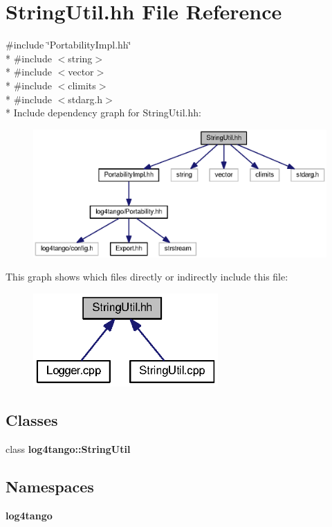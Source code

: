 \section{String\-Util.\-hh File Reference}
\label{StringUtil_8hh}
{\ttfamily \#include \char`\"{}Portability\-Impl.\-hh\char`\"{}}\\*
{\ttfamily \#include $<$string$>$}\\*
{\ttfamily \#include $<$vector$>$}\\*
{\ttfamily \#include $<$climits$>$}\\*
{\ttfamily \#include $<$stdarg.\-h$>$}\\*
Include dependency graph for String\-Util.\-hh\-:
\nopagebreak
\begin{figure}[H]
\begin{center}
\leavevmode
\includegraphics[width=350pt]{d3/d93/StringUtil_8hh__incl}
\end{center}
\end{figure}
This graph shows which files directly or indirectly include this file\-:
\nopagebreak
\begin{figure}[H]
\begin{center}
\leavevmode
\includegraphics[width=200pt]{d1/d88/StringUtil_8hh__dep__incl}
\end{center}
\end{figure}
\subsection*{Classes}
\begin{DoxyCompactItemize}
\item 
class {\bf log4tango\-::\-String\-Util}
\end{DoxyCompactItemize}
\subsection*{Namespaces}
\begin{DoxyCompactItemize}
\item 
{\bf log4tango}
\end{DoxyCompactItemize}
